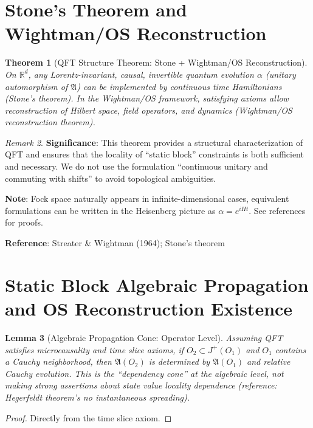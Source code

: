 \documentclass[11pt]{article}
\newtheorem{theorem}{Theorem}[section]
\newtheorem{lemma}[theorem]{Lemma}
\theoremstyle{definition}
\theoremstyle{remark}
\newtheorem{remark}[theorem]{Remark}
\begin{document}
\section{Stone's Theorem and Wightman/OS Reconstruction}\label{sec:stone}

\begin{theorem}[QFT Structure Theorem: Stone + Wightman/OS Reconstruction]\label{thm:structure}
On \( \mathbb{R}^d \), any Lorentz-invariant, causal, invertible quantum evolution \( \alpha \) (unitary automorphism of \( \mathfrak{A} \)) can be implemented by continuous time Hamiltonians (Stone's theorem). In the Wightman/OS framework, satisfying axioms allow reconstruction of Hilbert space, field operators, and dynamics (Wightman/OS reconstruction theorem).
\end{theorem}

\begin{remark}
\textbf{Significance}: This theorem provides a structural characterization of QFT and ensures that the locality of ``static block'' constraints is both sufficient and necessary. We do not use the formulation ``continuous unitary and commuting with shifts'' to avoid topological ambiguities.

\textbf{Note}: Fock space naturally appears in infinite-dimensional cases, equivalent formulations can be written in the Heisenberg picture as \( \alpha = e^{i H t} \). See references for proofs.

\textbf{Reference}: Streater \& Wightman (1964); Stone's theorem
\end{remark}

\section{Static Block Algebraic Propagation and OS Reconstruction Existence}\label{sec:propagation}

\begin{lemma}[Algebraic Propagation Cone: Operator Level]\label{lem:propagation}
Assuming QFT satisfies microcausality and time slice axioms, if \( O_2 \subset J^+(O_1) \) and \( O_1 \) contains a Cauchy neighborhood, then \( \mathfrak{A}(O_2) \) is determined by \( \mathfrak{A}(O_1) \) and relative Cauchy evolution. This is the ``dependency cone'' at the algebraic level, not making strong assertions about state value locality dependence (reference: Hegerfeldt theorem's no instantaneous spreading).
\end{lemma}

\begin{proof}
Directly from the time slice axiom.
\end{proof}
\end{document}

